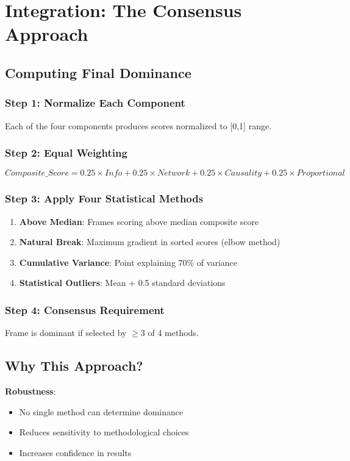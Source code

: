 \documentclass[11pt]{article}
\begin{document}
\section{Integration: The Consensus Approach}

\subsection{Computing Final Dominance}

\subsubsection{Step 1: Normalize Each Component}
Each of the four components produces scores normalized to [0,1] range.

\subsubsection{Step 2: Equal Weighting}
$$Composite\_Score = 0.25 \times Info + 0.25 \times Network + 0.25 \times Causality + 0.25 \times Proportional$$

\subsubsection{Step 3: Apply Four Statistical Methods}
\begin{enumerate}
    \item \textbf{Above Median}: Frames scoring above median composite score
    \item \textbf{Natural Break}: Maximum gradient in sorted scores (elbow method)
    \item \textbf{Cumulative Variance}: Point explaining 70\% of variance
    \item \textbf{Statistical Outliers}: Mean + 0.5 standard deviations
\end{enumerate}

\subsubsection{Step 4: Consensus Requirement}
Frame is dominant if selected by $\geq 3$ of 4 methods.

\subsection{Why This Approach?}

\textbf{Robustness}:
\begin{itemize}
    \item No single method can determine dominance
    \item Reduces sensitivity to methodological choices
    \item Increases confidence in results
\end{itemize}
\end{document}
